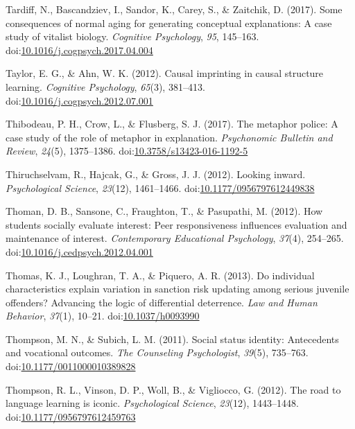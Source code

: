 \documentclass[english,man]{apa6}
\begin{document}
\hypertarget{ref-Tardiff2017}{}
Tardiff, N., Bascandziev, I., Sandor, K., Carey, S., \& Zaitchik, D.
(2017). Some consequences of normal aging for generating conceptual
explanations: A case study of vitalist biology. \emph{Cognitive
Psychology}, \emph{95}, 145--163.
doi:\href{https://doi.org/10.1016/j.cogpsych.2017.04.004}{10.1016/j.cogpsych.2017.04.004}

\hypertarget{ref-Taylor2012}{}
Taylor, E. G., \& Ahn, W. K. (2012). Causal imprinting in causal
structure learning. \emph{Cognitive Psychology}, \emph{65}(3), 381--413.
doi:\href{https://doi.org/10.1016/j.cogpsych.2012.07.001}{10.1016/j.cogpsych.2012.07.001}

\hypertarget{ref-Thibodeau2017}{}
Thibodeau, P. H., Crow, L., \& Flusberg, S. J. (2017). The metaphor
police: A case study of the role of metaphor in explanation.
\emph{Psychonomic Bulletin and Review}, \emph{24}(5), 1375--1386.
doi:\href{https://doi.org/10.3758/s13423-016-1192-5}{10.3758/s13423-016-1192-5}

\hypertarget{ref-Thiruchselvam2012}{}
Thiruchselvam, R., Hajcak, G., \& Gross, J. J. (2012). Looking inward.
\emph{Psychological Science}, \emph{23}(12), 1461--1466.
doi:\href{https://doi.org/10.1177/0956797612449838}{10.1177/0956797612449838}

\hypertarget{ref-Thoman2012}{}
Thoman, D. B., Sansone, C., Fraughton, T., \& Pasupathi, M. (2012). How
students socially evaluate interest: Peer responsiveness influences
evaluation and maintenance of interest. \emph{Contemporary Educational
Psychology}, \emph{37}(4), 254--265.
doi:\href{https://doi.org/10.1016/j.cedpsych.2012.04.001}{10.1016/j.cedpsych.2012.04.001}

\hypertarget{ref-Thomas2013}{}
Thomas, K. J., Loughran, T. A., \& Piquero, A. R. (2013). Do individual
characteristics explain variation in sanction risk updating among
serious juvenile offenders? Advancing the logic of differential
deterrence. \emph{Law and Human Behavior}, \emph{37}(1), 10--21.
doi:\href{https://doi.org/10.1037/h0093990}{10.1037/h0093990}

\hypertarget{ref-Thompson2011}{}
Thompson, M. N., \& Subich, L. M. (2011). Social status identity:
Antecedents and vocational outcomes. \emph{The Counseling Psychologist},
\emph{39}(5), 735--763.
doi:\href{https://doi.org/10.1177/0011000010389828}{10.1177/0011000010389828}

\hypertarget{ref-Thompson2012}{}
Thompson, R. L., Vinson, D. P., Woll, B., \& Vigliocco, G. (2012). The
road to language learning is iconic. \emph{Psychological Science},
\emph{23}(12), 1443--1448.
doi:\href{https://doi.org/10.1177/0956797612459763}{10.1177/0956797612459763}
\end{document}
